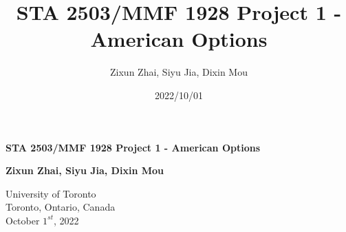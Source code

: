 \documentclass[12pt, letterpaper]{article}
\title{STA 2503/MMF 1928 Project 1 - American Options}
\author{Zixun Zhai, Siyu Jia, Dixin Mou}
\date{2022/10/01}
\begin{document}
\begin{titlepage}
  \begin{center}
      \vspace*{7cm}

      \textbf{STA 2503/MMF 1928 Project 1 - American Options}

           
      \vspace{1.5cm}

      \textbf{Zixun Zhai, Siyu Jia, Dixin Mou}

      \vfill
           
           
      \vspace{0.8cm}
           
      University of Toronto\\
      Toronto, Ontario, Canada\\
      October $1^{st}$, 2022 
           
  \end{center}
\end{titlepage}
\end{document}
